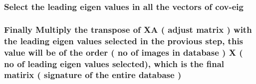 \documentclass[10pt,a4paper]{article}
\begin{document}
\subsubsection{ Select the leading eigen values in all the vectors of cov-eig }

\subsubsection{ Finally Multiply the transpose of XA ( adjust matrix ) with the leading eigen values selected in the provious step, this value will be of the order ( no of images in database ) X ( no of leading eigen values selected), which is the final matirix ( signature of the entire database ) }
\end{document}
